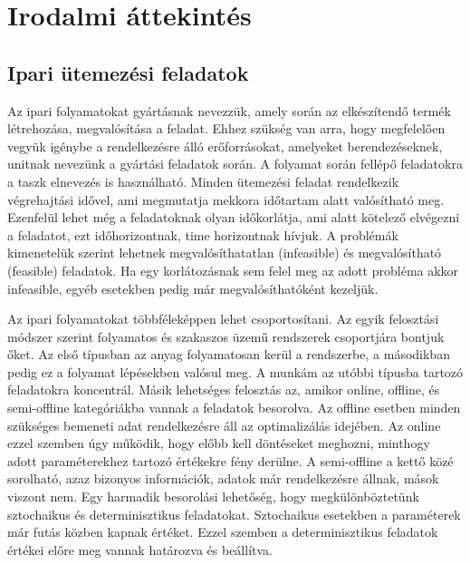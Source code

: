 \chapter{Irodalmi áttekintés}
\section{Ipari ütemezési feladatok}
Az ipari folyamatokat gyártásnak nevezzük, amely során az elkészítendő termék létrehozása, megvalósítása a feladat. Ehhez szükség van arra, hogy megfelelően vegyük igénybe a rendelkezésre álló erőforrásokat, amelyeket berendezéseknek, unitnak nevezünk a gyártási feladatok során. A folyamat során fellépő feladatokra a taszk elnevezés is használható. Minden ütemezési feladat rendelkezik végrehajtási idővel, ami megmutatja mekkora időtartam alatt valósítható meg. Ezenfelül lehet még a feladatoknak olyan időkorlátja, ami alatt kötelező elvégezni a feladatot, ezt időhorizontnak, time horizontnak hívjuk. A problémák kimenetelük szerint lehetnek megvalósíthatatlan (infeasible) és megvalósítható (feasible) feladatok. Ha egy korlátozásnak sem felel meg az adott probléma akkor infeasible, egyéb esetekben pedig már megvalósíthatóként kezeljük.

Az ipari folyamatokat többféleképpen lehet csoportosítani. Az egyik felosztási módszer szerint folyamatos és szakaszos üzemű rendszerek csoportjára bontjuk őket. Az első típusban az anyag folyamatosan kerül a rendszerbe, a másodikban pedig ez a folyamat lépésekben valósul meg. A munkám az utóbbi típusba tartozó feladatokra koncentrál. Másik lehetséges felosztás az, amikor online, offline, és semi-offline kategóriákba vannak a feladatok besorolva. Az offline esetben minden szükséges bemeneti adat rendelkezésre áll az optimalizálás idejében. Az online ezzel szemben úgy működik, hogy előbb kell döntéseket meghozni, minthogy adott paraméterekhez tartozó értékekre fény derülne. A semi-offline a kettő közé sorolható, azaz bizonyos információk, adatok már rendelkezésre állnak, mások viszont nem. Egy harmadik besorolási lehetőség, hogy megkülönböztetünk sztochaikus és determinisztikus feladatokat. Sztochaikus esetekben a paraméterek már futás közben kapnak értéket. Ezzel szemben a determinisztikus feladatok értékei előre meg vannak határozva és beállítva.

